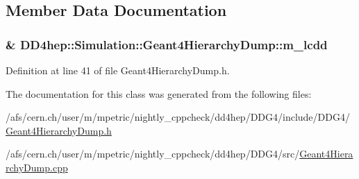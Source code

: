 \subsection{Member Data Documentation}
\hypertarget{class_d_d4hep_1_1_simulation_1_1_geant4_hierarchy_dump_a28785ab85c2dfa536abf8050804796d7}{
\subsubsection[{m\_\-lcdd}]{\& {\bf DD4hep::Simulation::Geant4HierarchyDump::m\_\-lcdd}}}
\label{class_d_d4hep_1_1_simulation_1_1_geant4_hierarchy_dump_a28785ab85c2dfa536abf8050804796d7}


Definition at line 41 of file Geant4HierarchyDump.h.

The documentation for this class was generated from the following files:\begin{DoxyCompactItemize}
\item 
/afs/cern.ch/user/m/mpetric/nightly\_\-cppcheck/dd4hep/DDG4/include/DDG4/\hyperlink{_geant4_hierarchy_dump_8h}{Geant4HierarchyDump.h}\item 
/afs/cern.ch/user/m/mpetric/nightly\_\-cppcheck/dd4hep/DDG4/src/\hyperlink{_geant4_hierarchy_dump_8cpp}{Geant4HierarchyDump.cpp}\end{DoxyCompactItemize}
